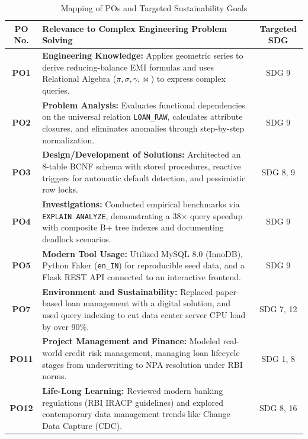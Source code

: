 \documentclass[11pt,a4paper]{report}
\begin{document}
\begin{table}[H]
    \centering
    \renewcommand{\arraystretch}{1.3}
    \setlength{\tabcolsep}{7pt}
    \caption{Mapping of POs and Targeted Sustainability Goals}
    \label{tab:po_mapping}
    \footnotesize
    \begin{tabular}{|c|p{8.5cm}|c|}
        \hline
        \textbf{PO No.} & \textbf{Relevance to Complex Engineering Problem Solving} & \textbf{Targeted SDG} \\
        \hline
        \textbf{PO1} & \textbf{Engineering Knowledge:} Applies geometric series to derive reducing-balance EMI formulas and uses Relational Algebra ($\pi, \sigma, \gamma, \bowtie$) to express complex queries. & SDG 9 \\
        \hline
        \textbf{PO2} & \textbf{Problem Analysis:} Evaluates functional dependencies on the universal relation \texttt{LOAN\_RAW}, calculates attribute closures, and eliminates anomalies through step-by-step normalization. & SDG 9 \\
        \hline
        \textbf{PO3} & \textbf{Design/Development of Solutions:} Architected an 8-table BCNF schema with stored procedures, reactive triggers for automatic default detection, and pessimistic row locks. & SDG 8, 9 \\
        \hline
        \textbf{PO4} & \textbf{Investigations:} Conducted empirical benchmarks via \texttt{EXPLAIN ANALYZE}, demonstrating a 38$\times$ query speedup with composite B+ tree indexes and documenting deadlock scenarios. & SDG 9 \\
        \hline
        \textbf{PO5} & \textbf{Modern Tool Usage:} Utilized MySQL 8.0 (InnoDB), Python Faker (\texttt{en\_IN}) for reproducible seed data, and a Flask REST API connected to an interactive frontend. & SDG 9 \\
        \hline
        \textbf{PO7} & \textbf{Environment and Sustainability:} Replaced paper-based loan management with a digital solution, and used query indexing to cut data center server CPU load by over 90\%. & SDG 7, 12 \\
        \hline
        \textbf{PO11} & \textbf{Project Management and Finance:} Modeled real-world credit risk management, managing loan lifecycle stages from underwriting to NPA resolution under RBI norms. & SDG 1, 8 \\
        \hline
        \textbf{PO12} & \textbf{Life-Long Learning:} Reviewed modern banking regulations (RBI IRACP guidelines) and explored contemporary data management trends like Change Data Capture (CDC). & SDG 8, 16 \\
        \hline
    \end{tabular}
\end{table}
\end{document}
